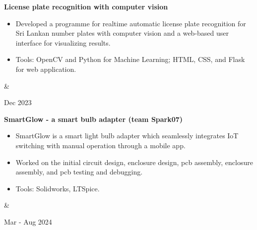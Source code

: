 \documentclass[10pt, a4paper]{article}
\newenvironment{highlights}{
        \begin{itemize}[
                topsep=0pt,
                parsep=0.10 cm,
                partopsep=0pt,
                itemsep=0pt,
                after=\vspace{-1\baselineskip},
                leftmargin=0.4 cm + 3pt
            ]
    }{
        \end{itemize}
    } %
\let\originalTabularx\tabularx
\let\originalEndTabularx\endtabularx
\renewenvironment{tabularx}{\bgroup\centering\originalTabularx}{\originalEndTabularx\par\egroup}
\begin{document}
        \vspace{0.2 cm}
        \begin{tabularx}{
            \textwidth-0.4 cm-0.13cm
        }{
            K{0.2 cm}
            R{4.1 cm}
        }
            \textbf{License plate recognition with computer vision}

            \vspace{0.10 cm}

            \begin{highlights}
                \item Developed a programme for realtime automatic license plate recognition for Sri Lankan number plates with computer vision and a web-based user interface for visualizing results.
                \item Tools: OpenCV and Python for Machine Learning; HTML, CSS, and Flask for web application.
            \end{highlights}
            &
            

            Dec 2023
        \end{tabularx}
        
        
		\vspace{0.2 cm}
        \begin{tabularx}{
            \textwidth-0.4 cm-0.13cm
        }{
            K{0.2 cm}
            R{4.1 cm}
        }
            \textbf{SmartGlow - a smart bulb adapter (team Spark07)}

            \vspace{0.10 cm}

            \begin{highlights}
                \item SmartGlow is a smart light bulb adapter which seamlessly integrates IoT switching with manual operation through a mobile app. 
                \item Worked on the initial circuit design, enclosure design, pcb assembly, enclosure assembly, and pcb testing and debugging.
                \item Tools: Solidworks, LTSpice.
            \end{highlights}
            &
            

            Mar - Aug 2024
        \end{tabularx}
        
\end{document}
